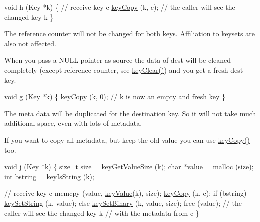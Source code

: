 \begin{DoxyCode}
\textcolor{keywordtype}{void} h (Key *k)
\{
        \textcolor{comment}{// receive key c}
        \hyperlink{group__key_ga6a12cbbe656a1ad9f41b8c681d7a2f92}{keyCopy} (k, c);
        \textcolor{comment}{// the caller will see the changed key k}
\}
\end{DoxyCode}


The reference counter will not be changed for both keys. Affiliation to keysets are also not affected.

When you pass a N\-U\-L\-L-\/pointer as source the data of dest will be cleaned completely (except reference counter, see \hyperlink{group__key_gab2242311a36bbc0520e0d36895107ec1}{key\-Clear()}) and you get a fresh dest key.


\begin{DoxyCode}
\textcolor{keywordtype}{void} g (Key *k)
\{
        \hyperlink{group__key_ga6a12cbbe656a1ad9f41b8c681d7a2f92}{keyCopy} (k, 0);
        \textcolor{comment}{// k is now an empty and fresh key}
\}
\end{DoxyCode}


The meta data will be duplicated for the destination key. So it will not take much additional space, even with lots of metadata.

If you want to copy all metadata, but keep the old value you can use \hyperlink{group__key_ga6a12cbbe656a1ad9f41b8c681d7a2f92}{key\-Copy()} too.


\begin{DoxyCode}
\textcolor{keywordtype}{void} j (Key *k)
\{
        \textcolor{keywordtype}{size\_t} size = \hyperlink{group__keyvalue_gae326672fffb7474abfe9baf53b73217e}{keyGetValueSize} (k);
        \textcolor{keywordtype}{char} *value = malloc (size);
        \textcolor{keywordtype}{int} bstring = \hyperlink{group__keytest_gaea7670778abd07fee0fe8ac12a149190}{keyIsString} (k);

        \textcolor{comment}{// receive key c}
        memcpy (value, \hyperlink{group__keyvalue_ga6f29609c5da53c6dc26a98678d5752af}{keyValue}(k), size);
        \hyperlink{group__key_ga6a12cbbe656a1ad9f41b8c681d7a2f92}{keyCopy} (k, c);
        \textcolor{keywordflow}{if} (bstring) \hyperlink{group__keyvalue_ga622bde1eb0e0c4994728331326340ef2}{keySetString} (k, value);
        \textcolor{keywordflow}{else} \hyperlink{group__keyvalue_gaa50a5358fd328d373a45f395fa1b99e7}{keySetBinary} (k, value, size);
        free (value);
        \textcolor{comment}{// the caller will see the changed key k}
        \textcolor{comment}{// with the metadata from c}
\}
\end{DoxyCode}


